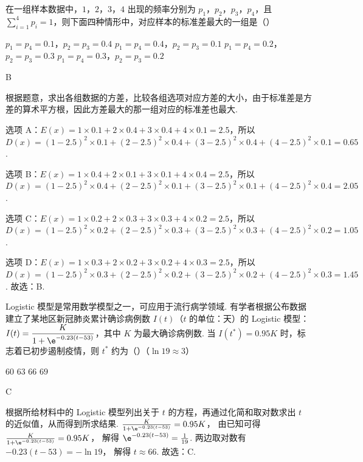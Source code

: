 \begin{problem}
在一组样本数据中，\(1\)，\(2\)，\(3\)，\(4\) 出现的频率分别为 \(p_1\)，\(p_2\)，\(p_3\)，\(p_4\)，且 \(\sum_{i=1}^{4} p_i=1\)，则下面四种情形中，对应样本的标准差最大的一组是（\quad）

\choices
    {\(p_1=p_4=0.1\)，\(p_2=p_3=0.4\)}
    {\(p_1=p_4=0.4\)，\(p_2=p_3=0.1\)}
    {\(p_1=p_4=0.2\)，\(p_2=p_3=0.3\)}
    {\(p_1=p_4=0.3\)，\(p_2=p_3=0.2\)}
\end{problem}

\begin{answer}
B
\end{answer}

\begin{solution}
根据题意，求出各组数据的方差，比较各组选项对应方差的大小，由于标准差是方差的算术平方根，因此方差最大的那一组对应的标准差也最大.

选项 A：\(E(x)=1\times0.1+2\times0.4+3\times0.4+4\times0.1=2.5\)，所以
\(D(x)=(1-2.5)^2\times0.1+(2-2.5)^2\times0.4+(3-2.5)^2\times0.4+(4-2.5)^2\times0.1=0.65\).

选项 B：\(E(x)=1\times0.4+2\times0.1+3\times0.1+4\times0.4=2.5\)，所以
\(D(x)=(1-2.5)^2\times0.4+(2-2.5)^2\times0.1+(3-2.5)^2\times0.1+(4-2.5)^2\times0.4=2.05\).

选项 C：\(E(x)=1\times0.2+2\times0.3+3\times0.3+4\times0.2=2.5\)，所以
\(D(x)=(1-2.5)^2\times0.2+(2-2.5)^2\times0.3+(3-2.5)^2\times0.3+(4-2.5)^2\times0.2=1.05\).

选项 D：\(E(x)=1\times0.3+2\times0.2+3\times0.2+4\times0.3=2.5\)，所以
\(D(x)=(1-2.5)^2\times0.3+(2-2.5)^2\times0.2+(3-2.5)^2\times0.2+(4-2.5)^2\times0.3=1.45\).
故选：B.
\end{solution}

\begin{problem}
Logistic 模型是常用数学模型之一，可应用于流行病学领域. 有学者根据公布数据建立了某地区新冠肺炎累计确诊病例数 \(I(t)\)（\(t\) 的单位：天）的 Logistic 模型：\(I(t)=\dfrac{K}{1+\e^{-0.23(t-53)}}\)，其中 \(K\) 为最大确诊病例数. 当 \(I(t^*)=0.95K\) 时，标志着已初步遏制疫情，则 \(t^*\) 约为（\quad）（\(\ln19\approx3\)）

\choices
    {\(60\)}
    {\(63\)}
    {\(66\)}
    {\(69\)}
\end{problem}

\begin{answer}
C
\end{answer}

\begin{solution}
根据所给材料中的 Logistic 模型列出关于 \(t\) 的方程，再通过化简和取对数求出 \(t\) 的近似值，从而得到所求结果.
\(\frac{K}{1+\e^{-0.23(t-53)}}=0.95K\)，
由已知可得
\(\frac{K}{1+\e^{-0.23(t-53)}}=0.95K\)，
解得
\(\e^{-0.23(t-53)}=\frac{1}{19}\).
两边取对数有
\(-0.23(t-53)=-\ln19\)，
解得
\(t\approx66\).
故选：C.
\end{solution}

